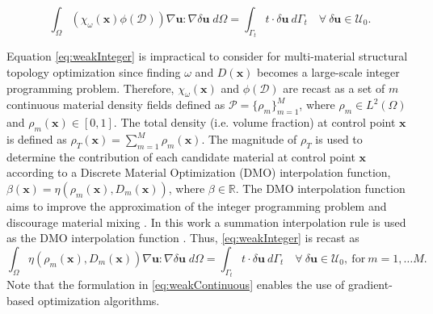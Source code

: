 \begin{equation}
\label{eq:weakInteger}
\int_{\Omega}(\chi_{\omega}(\bm x)\phi(\mathcal{D}))\nabla\bm u\colon\nabla\delta\bm u\; d\Omega=\int_{\Gamma_{t}} t\cdot\delta\bm{u}\ d\Gamma_t\quad\forall\ \delta\bm u\in\mathcal{U}_0.
\end{equation}
\vspace{3pt}

Equation \eqref{eq:weakInteger} is impractical to consider for multi-material structural topology optimization since finding $\omega$ and $D(\mathbf{x})$ becomes a large-scale integer programming problem. Therefore, $\chi_{\omega}(\bm x)$ and $\phi(\mathcal{D})$ are recast as a set of $m$ continuous material density fields defined as $\mathcal{P}=\{\rho_m\}_{m=1}^{M}$, where $\rho_m\in L^2(\Omega)$ and $\rho_m(\bm x)\in[0,1]$. The total density (i.e. volume fraction) at control point $\bm x$ is defined as $\rho_{T}(\bm x)=\sum_{m=1}^{M}\rho_m(\bm x)$. The magnitude of $\rho_{T}$ is used to determine the contribution of each candidate material at control point $\bm x$ according to a Discrete Material Optimization (DMO) interpolation function, $\beta(\bm x)=\eta(\rho_m(\bm x),D_m(\bm x))$, where $\beta\in\mathbb{R}$. The DMO interpolation function aims to improve the approximation of the integer programming problem and discourage material mixing \cite{lund2005structural,stegmann2005discrete}. In this work a summation interpolation rule is used as the DMO interpolation function \cite{gao2011mass,hvejsel2011material}. Thus, \eqref{eq:weakInteger} is recast as
\begin{equation}
\label{eq:weakContinuous}
\int_{\Omega}\eta({\rho}_m(\bm x),D_m(\bm x))\nabla\bm u\colon\nabla\delta\bm u\; d\Omega=\int_{\Gamma_{t}} t\cdot\delta\bm{u}\ d\Gamma_t\quad\forall\ \delta\bm u\in\mathcal{U}_0,\ \mbox{for}\ m=1,\dots{M}.
\end{equation}
Note that the formulation in \eqref{eq:weakContinuous} enables the use of gradient-based optimization algorithms.\\

